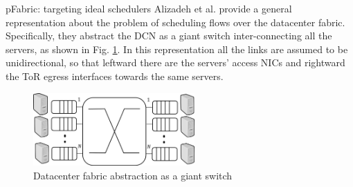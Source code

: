 \begin{subsection}{pFabric: targeting ideal schedulers}
Alizadeh et al. provide a general representation about the problem of scheduling flows over the datacenter fabric. Specifically, they abstract the DCN as a giant switch inter-connecting all the servers, as shown in Fig. \ref{fig:pfabricdcn}. In this representation all the links are assumed to be unidirectional, so that leftward there are the servers' access NICs and rightward the ToR egress interfaces towards the same servers.

\begin{figure}
	\centering
	\includegraphics[width=0.55\textwidth]{Chapter2/Figures/pfabricdcn}
	\caption{Datacenter fabric abstraction as a giant switch}
	\label{fig:pfabricdcn}
\end{figure}


\end{subsection}
